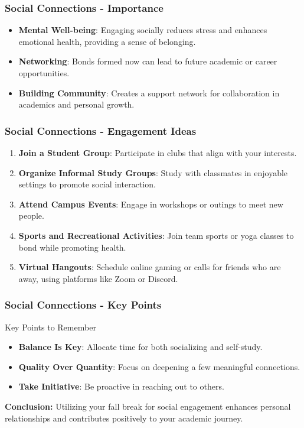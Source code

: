 \documentclass[aspectratio=169]{beamer}
\begin{document}
\begin{frame}[fragile]
    \frametitle{Social Connections - Importance}
    \begin{itemize}
        \item \textbf{Mental Well-being}: 
        Engaging socially reduces stress and enhances emotional health, providing a sense of belonging.
        
        \item \textbf{Networking}: 
        Bonds formed now can lead to future academic or career opportunities.
        
        \item \textbf{Building Community}: 
        Creates a support network for collaboration in academics and personal growth.
    \end{itemize}
\end{frame}

\begin{frame}[fragile]
    \frametitle{Social Connections - Engagement Ideas}
    \begin{enumerate}
        \item \textbf{Join a Student Group}:
        Participate in clubs that align with your interests.
        
        \item \textbf{Organize Informal Study Groups}:
        Study with classmates in enjoyable settings to promote social interaction.
        
        \item \textbf{Attend Campus Events}:
        Engage in workshops or outings to meet new people.
        
        \item \textbf{Sports and Recreational Activities}:
        Join team sports or yoga classes to bond while promoting health.
        
        \item \textbf{Virtual Hangouts}:
        Schedule online gaming or calls for friends who are away, using platforms like Zoom or Discord.
    \end{enumerate}
\end{frame}

\begin{frame}[fragile]
    \frametitle{Social Connections - Key Points}
    \begin{block}{Key Points to Remember}
        \begin{itemize}
            \item \textbf{Balance Is Key}: Allocate time for both socializing and self-study.
            \item \textbf{Quality Over Quantity}: Focus on deepening a few meaningful connections.
            \item \textbf{Take Initiative}: Be proactive in reaching out to others.
        \end{itemize}
    \end{block}
    
    \textbf{Conclusion:} Utilizing your fall break for social engagement enhances personal relationships and contributes positively to your academic journey.
\end{frame}
\end{document}
